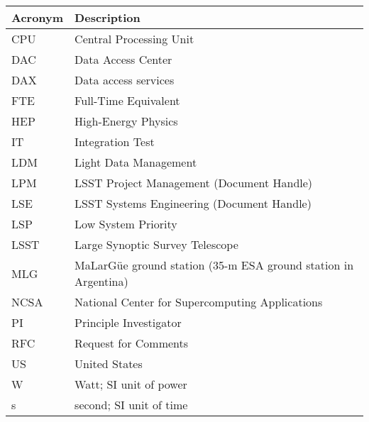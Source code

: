 \addtocounter{table}{-1}
\begin{longtable}{|l|p{}|}\hline
\textbf{Acronym} & \textbf{Description}  \\\hline

CPU&Central Processing Unit \\\hline
DAC&Data Access Center \\\hline
DAX&Data access services \\\hline
FTE&Full-Time Equivalent \\\hline
HEP&High-Energy Physics \\\hline
IT&Integration Test \\\hline
LDM&Light Data Management \\\hline
LPM&LSST Project Management (Document Handle) \\\hline
LSE&LSST Systems Engineering (Document Handle) \\\hline
LSP&Low System Priority \\\hline
LSST&Large Synoptic Survey Telescope \\\hline
MLG&MaLarG\"ue ground station (35-m ESA ground station in Argentina) \\\hline
NCSA&National Center for Supercomputing Applications \\\hline
PI&Principle Investigator \\\hline
RFC&Request for Comments \\\hline
US&United States \\\hline
W&Watt; SI unit of power \\\hline
s&second; SI unit of time \\\hline
\end{longtable}
